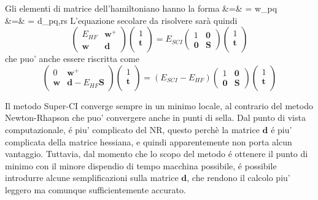 Gli elementi di matrice dell'hamiltoniano hanno la forma
\beqas
{} &=&  = w_{pq} \\
 &=&  = d_{pq,rs}
\eeqas
L'equazione secolare da risolvere sar\`a quindi
$$
\left(
\begin{array}{cc}
E_{HF} & \mathbf{w}^+ \\
\mathbf{w} & \mathbf{d}
\end{array} \right)
\left(
\begin{array}{c}
1 \\
\mathbf{t} \\
\end{array}
\right)
= E_{SCI}
\left(
\begin{array}{cc}
1 & \mathbf{0} \\
\mathbf{0} & \mathbf{S}
\end{array}
\right)
\left(
\begin{array}{c}
1 \\
\mathbf{t} \\
\end{array}
\right)
$$
che puo' anche essere riscritta come
$$
\left(
\begin{array}{cc}
0 & \mathbf{w}^+ \\
\mathbf{w} & \mathbf{d}-E_{HF}\mathbf{S}
\end{array} \right)
\left(
\begin{array}{c}
1 \\
\mathbf{t} \\
\end{array}
\right)
= \left( E_{SCI} - E_{HF} \right)
\left(
\begin{array}{cc}
1 & \mathbf{0} \\
\mathbf{0} & \mathbf{S}
\end{array}
\right)
\left(
\begin{array}{c}
1 \\
\mathbf{t} \\
\end{array}
\right)
$$

Il metodo Super-CI converge sempre in un minimo locale, al contrario del
metodo Newton-Rhapson che puo' convergere anche in punti di sella.
Dal punto di vista computazionale, \'e piu' complicato del NR, questo
perch\`e la matrice $\mathbf{d}$ \'e piu' complicata della matrice
hessiana, e quindi apparentemente non porta alcun vantaggio. Tuttavia,
dal momento che lo scopo del metodo \'e ottenere il punto di minimo con
il minore dispendio di tempo macchina possibile, \'e possibile introdurre
alcune semplificazioni sulla matrice $\mathbf{d}$, che rendono il
calcolo piu' leggero ma comunque sufficientemente accurato.

